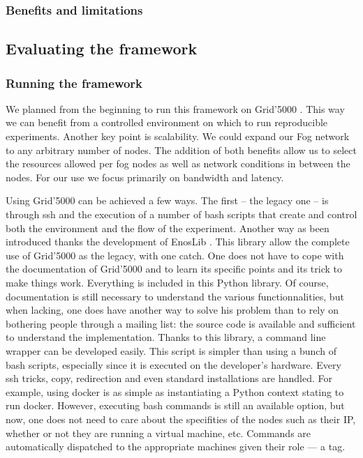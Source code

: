 \documentclass[11pt]{sdm}
\begin{document}
\subsubsection{Benefits and limitations}

\subsection{Evaluating the framework}

\subsubsection{Running the framework}

We planned from the beginning to run this framework on Grid'5000 . This way we can benefit from a controlled environment on which to run reproducible experiments.  Another key point is scalability. We could expand our Fog network to any arbitrary number of nodes. The addition of both benefits allow us to select the resources allowed per fog nodes as well as network conditions in between the nodes. For our use we focus primarily on bandwidth and latency.


Using Grid'5000 can be achieved a few ways. The first – the legacy one – is through ssh and the execution of a number of bash scripts that create and control both the environment and the flow of the experiment.
Another way as been introduced thanks the development of EnosLib \cite{cherrueau_enoslib_2022}. This library allow the complete use of Grid'5000 as the legacy, with one catch. One does not have to cope with the documentation of Grid'5000 and to learn its specific points and its trick to make things work. Everything is included in this Python library. Of course, documentation is still necessary to understand the various functionnalities, but when lacking, one does have another way to solve his problem than to rely on bothering people through a mailing list: the source code is available and sufficient to understand the implementation. 
Thanks to this library, a command line wrapper can be developed easily. This script is simpler than using a bunch of bash scripts, especially since it is executed on the developer's hardware. Every ssh tricks, copy, redirection and even standard installations are handled. For example, using docker is as simple as instantiating a Python context stating to run docker.
However, executing bash commands is still an available option, but now, one does not need to care about the specifities of the nodes such as their IP, whether or not they are running a virtual machine, etc. Commands are automatically dispatched to the appropriate machines given their role — a tag.
\end{document}

